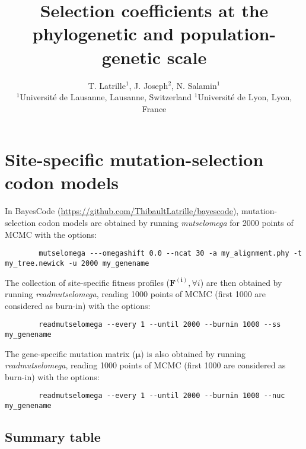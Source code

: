 \documentclass{article}
\title{Selection coefficients at the phylogenetic and population-genetic scale}
\author{
    \large
    T. {Latrille}$^{1}$, J. {Joseph}$^{2}$, N. {Salamin}$^{1}$\\
    $^{1}$Université de Lausanne, Lausanne, Switzerland
    $^{1}$Université de Lyon, Lyon, France
}
\newcommand{\UniDimArray}[1]{\bm{#1}}
\begin{document}
    \maketitle
    \tableofcontents
    \clearpage


    \section{Site-specific mutation-selection codon models}

    In BayesCode (\url{https://github.com/ThibaultLatrille/bayescode}), mutation-selection codon models are obtained by running \textit{mutselomega} for 2000 points of MCMC with the options:
    \begin{scriptsize}
        \begin{verbatim}
        mutselomega ---omegashift 0.0 --ncat 30 -a my_alignment.phy -t my_tree.newick -u 2000 my_genename
        \end{verbatim}
    \end{scriptsize}
    The collection of site-specific fitness profiles ($\UniDimArray{F^{(i)}}, \forall i$) are then obtained by running \textit{readmutselomega}, reading 1000 points of MCMC (first 1000 are considered as burn-in) with the options:
    \begin{scriptsize}
        \begin{verbatim}
        readmutselomega --every 1 --until 2000 --burnin 1000 --ss my_genename
        \end{verbatim}
    \end{scriptsize}
    The gene-specific mutation matrix ($\UniDimArray{\mu}$) is also obtained by running \textit{readmutselomega}, reading 1000 points of MCMC (first 1000 are considered as burn-in) with the options:
    \begin{scriptsize}
        \begin{verbatim}
        readmutselomega --every 1 --until 2000 --burnin 1000 --nuc my_genename
        \end{verbatim}
    \end{scriptsize}

    \subsection{Summary table}
\end{document}
